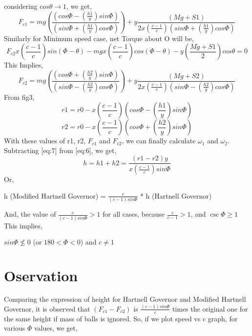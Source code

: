 \documentclass[15pt,a4paper,oneside]{article}
\begin{document}
considering $cos\theta\rightarrow1$, we get,
\begin{equation}
\label{eq:3}
F_{c1}=mg\left(\frac{\left(cos\Phi-\left(\frac{h1}{y}\right)sin\Phi\right)}{\left(sin\Phi+\left(\frac{h1}{y}\right)cos\Phi\right)}\right)+y\frac{\left(Mg+S1\right)}{2x\left(\frac{c-1}{c}\right)\left(sin\Phi+\left(\frac{h1}{y}\right)cos\Phi\right)}
\end{equation}
Similarly for Minimum speed case, net Torque about O will be,
\begin{equation}
\label{eq:4}
F_{c2}x\left(\frac{c-1}{c}\right)sin(\Phi-\theta)-mgx\left(\frac{c-1}{c}\right)cos(\Phi-\theta)-y\left(\frac{Mg+S1}{2}\right)cos\theta=0
\end{equation}
This Implies,
\begin{equation}
\label{eq:5}
F_{c2}=mg\left(\frac{\left(cos\Phi+\left(\frac{h2}{y}\right)sin\Phi\right)}{\left(sin\Phi-\left(\frac{h2}{y}\right)cos\Phi\right)}\right)+y\frac{\left(Mg+S2\right)}{2x\left(\frac{c-1}{c}\right)\left(sin\Phi-\left(\frac{h2}{y}\right)cos\Phi\right)}
\end{equation}
From fig3,
\begin{equation}
\label{eq:6}
r1=r0-x\left(\frac{c-1}{c}\right)\left(cos\Phi-\left(\frac{h1}{y}\right)sin\Phi\right)
\end{equation}
\begin{equation}
\label{eq:7}
r2=r0-x\left(\frac{c-1}{c}\right)\left(cos\Phi+\left(\frac{h2}{y}\right)sin\Phi\right)
\end{equation}
With these values of r1, r2, $F_{c1}$ and $F_{c2}$, we can finally calculate $\omega_{1}$ and $\omega_{2}$.\\Subtracting [eq:7] from [eq:6], we get,
\begin{equation}
\label{eq:8}
h=h1+h2=\frac{\left(r1-r2\right)y}{x\left(\frac{c-1}{c}\right)sin\Phi}
\end{equation}
Or,\\
\begin{center}
h (Modified Hartnell Governor) = $\frac{c}{(c-1)sin\Phi}$ * h (Hartnell Governor)\\
\end{center}
And, the value of $\frac{c}{(c-1)sin\Phi}>1$ for all cases, because $\frac{c}{c-1}>1$, and $\csc\Phi\geq1$ \\[0.5 cm]This implies,

$sin\Phi\nleqslant$0 (or $180<\Phi<0$) and $c\ne1$
\section{Oservation}
Comparing the expression of height for Hartnell Governor and Modified Hartnell Governor, it is observed that $(F_{c1}-F_{c2})$ is $\frac{\left(c-1\right)sin\Phi}{c}$ times the original one for the same height if mass of balls is ignored. So, if we plot speed vs c graph, for various $\Phi$ values, we get,
\end{document}
